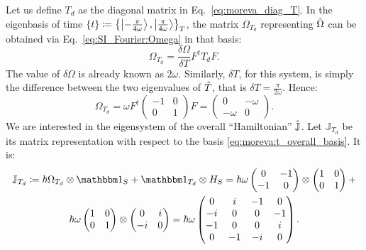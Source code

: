 Let us define $T_d$ as the diagonal matrix in Eq.~\eqref{eq:moreva_diag_T}.
In the eigenbasis of time $\qty{t} \coloneqq \qty{\ket{-\frac{\pi}{4\omega}}, \ket{\frac{\pi}{4\omega}}}_T$,
the matrix $\Omega_{T_d}$ representing $\hat{\Omega}$
can be obtained via Eq.~\eqref{eq:SI_Fourier:Omega} in that basis:
%
\begin{equation}
  \Omega_{T_d} =
  \frac{\delta\Omega}{\delta{T}} F^{\dagger} T_d F
  \text{.}
\end{equation}
The value of $\delta\Omega$ is already known as $2\omega$.
Similarly, $\delta{T}$, for this system, is simply the difference between the two eigenvalues of $\hat{T}$,
that is
$\delta{T} = \frac{\pi}{2\omega}$. Hence:
\begin{equation}
\Omega_{T_d} =
\omega
F^{\dagger}
\begin{pmatrix}
  -1    & 0   \\
   0    & 1
\end{pmatrix}
F =
\left(\begin{matrix}0 & - \omega\\- \omega & 0\end{matrix}\right)
\text{.}
\end{equation}
We are interested in the eigensystem of the overall ``Hamiltonian'' $\hat{\mathbb{J}}$.
Let $\mathbb{J}_{T_d}$ be its matrix representation with respect to the basis \eqref{eq:moreva:t_overall_basis}.
It is:
\begin{multline}\label{eq:moreva:t_J}
  \mathbb{J}_{T_d} \eqbydef \hbar \Omega_{T_d} \ox \idop_{S} + \idop_{T_d} \ox H_S =
    \hbar\omega
    \begin{pmatrix}0 & - 1\\- 1 & 0\end{pmatrix}
    \ox
    \begin{pmatrix} 1 & 0 \\  0 & 1 \end{pmatrix}
    + \\
    \hbar\omega
    \begin{pmatrix} 1 & 0 \\  0 & 1 \end{pmatrix}
    \ox
    \begin{pmatrix} 0 & i \\ -i & 0 \end{pmatrix}
    =
    \hbar\omega
    \begin{pmatrix}
      0   &i  &-1 &0  \\
      -i  &0  &0  &-1 \\
      -1  &0  &0  &i  \\
      0   &-1 &-i &0
    \end{pmatrix}
  \text{.}
\end{multline}
